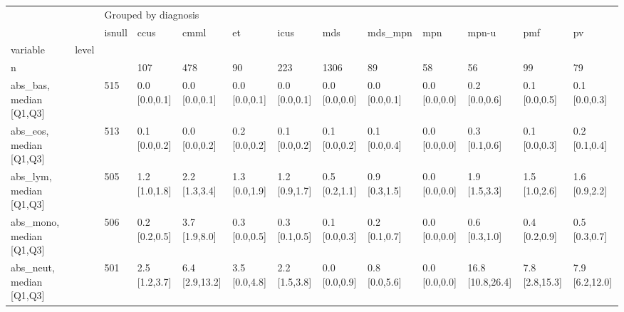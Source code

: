 \begin{tabular}{lllllllllllll}
\toprule
                 &    & \multicolumn{11}{l}{Grouped by diagnosis} \\
                 &    &               isnull &                ccus &               cmml &                   et &                icus &               mds &           mds\_mpn &               mpn &                mpn-u &                 pmf &                   pv \\
variable & level &                      &                     &                    &                      &                     &                   &                   &                   &                      &                     &                      \\
\midrule
n &    &                      &                 107 &                478 &                   90 &                 223 &              1306 &                89 &                58 &                   56 &                  99 &                   79 \\
abs\_bas, median [Q1,Q3] &    &                  515 &       0.0 [0.0,0.1] &      0.0 [0.0,0.1] &        0.0 [0.0,0.1] &       0.0 [0.0,0.1] &     0.0 [0.0,0.0] &     0.0 [0.0,0.1] &     0.0 [0.0,0.0] &        0.2 [0.0,0.6] &       0.1 [0.0,0.5] &        0.1 [0.0,0.3] \\
abs\_eos, median [Q1,Q3] &    &                  513 &       0.1 [0.0,0.2] &      0.0 [0.0,0.2] &        0.2 [0.0,0.2] &       0.1 [0.0,0.2] &     0.1 [0.0,0.2] &     0.1 [0.0,0.4] &     0.0 [0.0,0.0] &        0.3 [0.1,0.6] &       0.1 [0.0,0.3] &        0.2 [0.1,0.4] \\
abs\_lym, median [Q1,Q3] &    &                  505 &       1.2 [1.0,1.8] &      2.2 [1.3,3.4] &        1.3 [0.0,1.9] &       1.2 [0.9,1.7] &     0.5 [0.2,1.1] &     0.9 [0.3,1.5] &     0.0 [0.0,0.0] &        1.9 [1.5,3.3] &       1.5 [1.0,2.6] &        1.6 [0.9,2.2] \\
abs\_mono, median [Q1,Q3] &    &                  506 &       0.2 [0.2,0.5] &      3.7 [1.9,8.0] &        0.3 [0.0,0.5] &       0.3 [0.1,0.5] &     0.1 [0.0,0.3] &     0.2 [0.1,0.7] &     0.0 [0.0,0.0] &        0.6 [0.3,1.0] &       0.4 [0.2,0.9] &        0.5 [0.3,0.7] \\
abs\_neut, median [Q1,Q3] &    &                  501 &       2.5 [1.2,3.7] &     6.4 [2.9,13.2] &        3.5 [0.0,4.8] &       2.2 [1.5,3.8] &     0.0 [0.0,0.9] &     0.8 [0.0,5.6] &     0.0 [0.0,0.0] &     16.8 [10.8,26.4] &      7.8 [2.8,15.3] &       7.9 [6.2,12.0] \\

\end{tabular}
